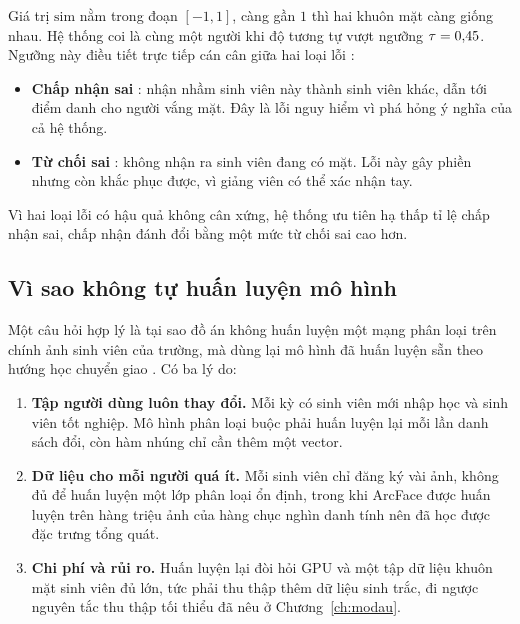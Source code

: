 Giá trị $\mathrm{sim}$ nằm trong đoạn $[-1, 1]$, càng gần $1$ thì hai khuôn
mặt càng giống nhau. Hệ thống coi là cùng một người khi độ tương tự vượt
ngưỡng $\tau = 0{,}45$. Ngưỡng này điều tiết trực tiếp cán cân giữa
hai loại lỗi \cite{Jain2004Biometric, ISO19795}:

\begin{itemize}[leftmargin=1.6em, itemsep=2pt]
  \item \textbf{Chấp nhận sai} : nhận nhầm sinh viên này
        thành sinh viên khác, dẫn tới điểm danh cho người vắng mặt. Đây là
        lỗi nguy hiểm vì phá hỏng ý nghĩa của cả hệ thống.
  \item \textbf{Từ chối sai} : không nhận ra sinh viên
        đang có mặt. Lỗi này gây phiền nhưng còn khắc phục được, vì giảng
        viên có thể xác nhận tay.
\end{itemize}

Vì hai loại lỗi có hậu quả không cân xứng, hệ thống ưu tiên hạ thấp tỉ lệ
chấp nhận sai, chấp nhận đánh đổi bằng một mức từ chối sai cao hơn.

\subsection{Vì sao không tự huấn luyện mô hình}
\label{sec:vosaokhonghuanluyen}

Một câu hỏi hợp lý là tại sao đồ án không huấn luyện một mạng phân loại trên
chính ảnh sinh viên của trường, mà dùng lại mô hình đã huấn luyện sẵn theo
hướng học chuyển giao  \cite{Pan2010Transfer}. Có ba lý do:

\begin{enumerate}[leftmargin=1.8em, itemsep=2pt]
  \item \textbf{Tập người dùng luôn thay đổi.} Mỗi kỳ có sinh viên mới nhập
        học và sinh viên tốt nghiệp. Mô hình phân loại buộc phải huấn luyện
        lại mỗi lần danh sách đổi, còn hàm nhúng chỉ cần thêm một vector.
  \item \textbf{Dữ liệu cho mỗi người quá ít.} Mỗi sinh viên chỉ đăng ký
        vài ảnh, không đủ để huấn luyện một lớp phân loại ổn định, trong khi
        ArcFace được huấn luyện trên hàng triệu ảnh của hàng chục nghìn danh
        tính \cite{Deng2019ArcFace} nên đã học được đặc trưng tổng quát.
  \item \textbf{Chi phí và rủi ro.} Huấn luyện lại đòi hỏi GPU và một tập
        dữ liệu khuôn mặt sinh viên đủ lớn, tức phải thu thập thêm dữ liệu
        sinh trắc, đi ngược nguyên tắc thu thập tối thiểu \cite{GDPR2016} đã nêu ở
        Chương~\ref{ch:modau}.
\end{enumerate}

